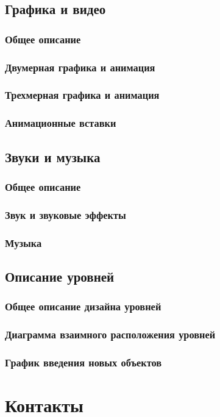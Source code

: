 \documentclass[a4paper,12pt]{article}
\begin{document}
\subsection{Графика и видео}
\subsubsection{Общее описание}
\subsubsection{Двумерная графика и анимация}
\subsubsection{Трехмерная графика и анимация}
\subsubsection{Анимационные вставки}
\subsection{Звуки и музыка}
\subsubsection{Общее описание}
\subsubsection{Звук и звуковые эффекты}
\subsubsection{Музыка}
\subsection{Описание уровней}
\subsubsection{Общее описание дизайна уровней}
\subsubsection{Диаграмма взаимного расположения уровней}
\subsubsection{График введения новых объектов}

\section{Контакты}
\end{document}
